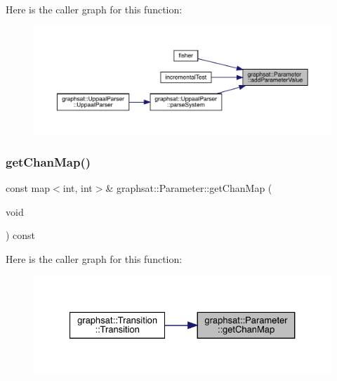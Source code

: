 Here is the caller graph for this function\+:
\nopagebreak
\begin{figure}[H]
\begin{center}
\leavevmode
\includegraphics[width=350pt]{classgraphsat_1_1_parameter_a9d1fc3675ee07f866afca38a9fd198ff_icgraph}
\end{center}
\end{figure}
\mbox{\label{classgraphsat_1_1_parameter_a3f4d846ef936f82d07b5a2e4e4b632ee}} 
\subsubsection{\texorpdfstring{getChanMap()}{getChanMap()}}
{\footnotesize\ttfamily const map$<$int, int$>$\& graphsat\+::\+Parameter\+::get\+Chan\+Map (\begin{DoxyParamCaption}\item[{void}]{ }\end{DoxyParamCaption}) const\hspace{0.3cm}{\ttfamily [inline]}}

Here is the caller graph for this function\+:
\nopagebreak
\begin{figure}[H]
\begin{center}
\leavevmode
\includegraphics[width=327pt]{classgraphsat_1_1_parameter_a3f4d846ef936f82d07b5a2e4e4b632ee_icgraph}
\end{center}
\end{figure}
\mbox{\label{classgraphsat_1_1_parameter_a452bc578f7adf8feaedd40f3aa06fab9}} 
